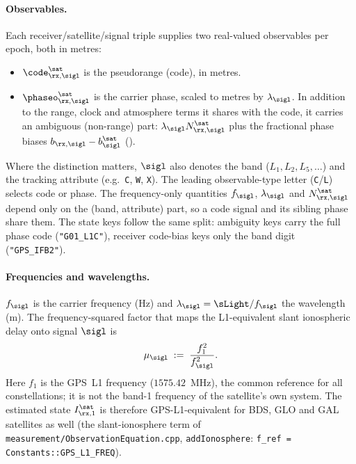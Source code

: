 \paragraph{Observables.}
Each receiver/satellite/signal triple supplies two real-valued
observables per epoch, both in metres:
\begin{itemize}[leftmargin=*, itemsep=0pt]
\item $\code^\sat_{\rx,\sigl}$ is the pseudorange (code), in metres.
\item $\phaseo^\sat_{\rx,\sigl}$ is the carrier phase, scaled to metres
      by $\lambda_\sigl$.  In addition to the range, clock and atmosphere
      terms it shares with the code, it carries an ambiguous (non-range)
      part: $\lambda_\sigl N^\sat_{\rx,\sigl}$ plus the fractional phase
      biases $b_{\rx,\sigl} - b^\sat_\sigl$ ().
\end{itemize}
Where the distinction matters, $\sigl$ also denotes the band
($L_1, L_2, L_5, \ldots$) and the tracking attribute (e.g.\ \texttt{C}, \texttt{W}, \texttt{X}).
The leading observable-type letter (\texttt{C}/\texttt{L}) selects code
or phase.  The frequency-only quantities $f_\sigl$, $\lambda_\sigl$ and
$N^\sat_{\rx,\sigl}$ depend only on the (band, attribute) part, so a code
signal and its sibling phase share them.  The state keys follow the same
split: ambiguity keys carry the full phase code (\texttt{"G01\_L1C"}),
receiver code-bias keys only the band digit (\texttt{"GPS\_IFB2"}).

\paragraph{Frequencies and wavelengths.}
$f_\sigl$ is the carrier frequency (Hz) and $\lambda_\sigl = \sLight / f_\sigl$
the wavelength (m).  The frequency-squared factor that maps the
L1-equivalent slant ionospheric delay onto signal $\sigl$ is
\begin{equation}
\mu_\sigl \;:=\; \frac{f_1^2}{f_\sigl^2}.
\label{eq:iono-scaling}
\end{equation}
Here $f_1$ is the GPS~L1 frequency ($1575.42$~MHz), the common
reference for all constellations; it is not the band-1 frequency of
the satellite's own system.  The estimated state $I^\sat_{\rx,1}$ is
therefore GPS-L1-equivalent for BDS, GLO and GAL satellites as well
(the slant-ionosphere term of \texttt{measurement/ObservationEquation.cpp},
\texttt{addIonosphere}: \texttt{f\_ref = Constants::GPS\_L1\_FREQ}).

